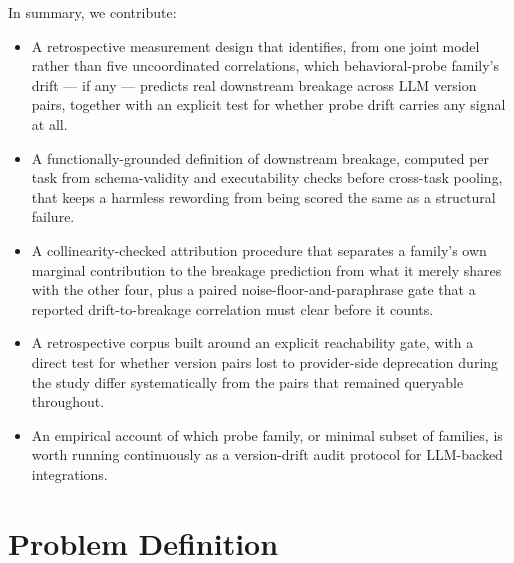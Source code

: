 \documentclass[11pt]{article}
\begin{document}
In summary, we contribute:
\begin{itemize}[leftmargin=1.4em]
\item A retrospective measurement design that identifies, from one joint model rather than five uncoordinated correlations, which behavioral-probe family's drift --- if any --- predicts real downstream breakage across LLM version pairs, together with an explicit test for whether probe drift carries any signal at all.
\item A functionally-grounded definition of downstream breakage, computed per task from schema-validity and executability checks before cross-task pooling, that keeps a harmless rewording from being scored the same as a structural failure.
\item A collinearity-checked attribution procedure that separates a family's own marginal contribution to the breakage prediction from what it merely shares with the other four, plus a paired noise-floor-and-paraphrase gate that a reported drift-to-breakage correlation must clear before it counts.
\item A retrospective corpus built around an explicit reachability gate, with a direct test for whether version pairs lost to provider-side deprecation during the study differ systematically from the pairs that remained queryable throughout.
\item An empirical account of which probe family, or minimal subset of families, is worth running continuously as a version-drift audit protocol for LLM-backed integrations.
\end{itemize}

\section{Problem Definition}
\end{document}
